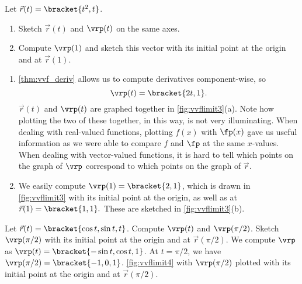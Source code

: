 \begin{example}\label{ex_vvflimit3}
Let $\vec r(t) =\bracket{t^2,t}$. 
\begin{enumerate}
	\item Sketch $\vec r(t)$ and $\vrp(t)$ on the same axes.
	\item	Compute $\vrp(1)$ and sketch this vector with its initial point at the origin and at $\vec r(1)$.
\end{enumerate}
\solution
\begin{enumerate}
\item	\autoref{thm:vvf_deriv} allows us to compute derivatives component-wise, so
\[\vrp(t) =\bracket{2t, 1}.\]
$\vec r(t)$ and $\vrp(t)$ are graphed together in \autoref{fig:vvflimit3}(a). Note how plotting the two of these together, in this way, is not very illuminating. When dealing with real-valued functions, plotting $f(x)$ with $\fp(x)$ gave us useful information as we were able to compare $f$ and $\fp$ at the same $x$-values. When dealing with vector-valued functions, it is hard to tell which points on the graph of $\vrp$ correspond to which points on the graph of $\vec r$.

\item	We easily compute $\vrp(1) =\bracket{2,1}$, which is drawn in \autoref{fig:vvflimit3} with its initial point at the origin, as well as at $\vec r(1) =\bracket{1,1}.$ These are sketched in \autoref{fig:vvflimit3}(b).
\end{enumerate}
\end{example}


\begin{example}\label{ex_vvflimit4}
Let $\vec r(t) =\bracket{\cos t, \sin t, t}$. Compute $\vrp(t)$ and $\vrp(\pi/2)$. Sketch $\vrp(\pi/2)$ with its initial point at the origin and at $\vec r(\pi/2)$.
\solution
We compute $\vrp$ as $\vrp(t) =\bracket{-\sin t, \cos t, 1}$. At $t= \pi/2$, we have $\vrp(\pi/2) =\bracket{-1,0,1}$. \autoref{fig:vvflimit4}
with $\vrp(\pi/2)$ plotted with its initial point at the origin and at $\vec r(\pi/2)$.
\end{example}

